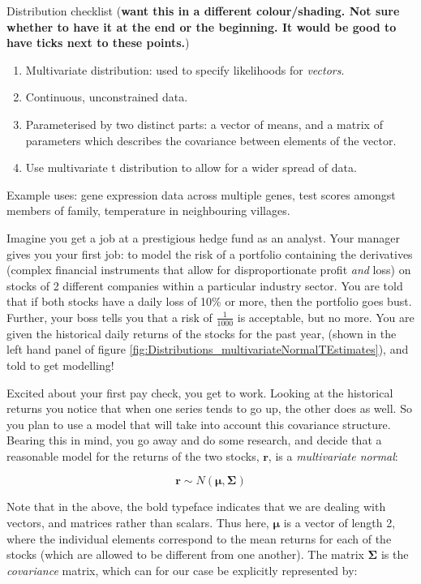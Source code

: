 \documentclass[11pt,fullpage]{book}
\begin{document}
Distribution checklist (\textbf{want this in a different colour/shading. Not sure whether to have it at the end or the beginning. It would be good to have ticks next to these points.})

\begin{enumerate}
\item Multivariate distribution: used to specify likelihoods for \textit{vectors}.
\item Continuous, unconstrained data.
\item Parameterised by two distinct parts: a vector of means, and a matrix of parameters which describes the covariance between elements of the vector.
\item Use multivariate t distribution to allow for a wider spread of data.
\end{enumerate}

Example uses: gene expression data across multiple genes, test scores amongst members of family, temperature in neighbouring villages.

Imagine you get a job at a prestigious hedge fund as an analyst. Your manager gives you your first job: to model the risk of a portfolio containing the derivatives (complex financial instruments that allow for disproportionate profit \textit{and} loss) on stocks of 2 different companies within a particular industry sector. You are told that if both stocks have a daily loss of 10\% or more, then the portfolio goes bust. Further, your boss tells you that a risk of $\frac{1}{1000}$ is acceptable, but no more. You are given the historical daily returns of the stocks for the past year, (shown in the left hand panel of figure \ref{fig:Distributions_multivariateNormalTEstimates}), and told to get modelling!

Excited about your first pay check, you get to work. Looking at the historical returns you notice that when one series tends to go up, the other does as well. So you plan to use a model that will take into account this covariance structure. Bearing this in mind, you go away and do some research, and decide that a reasonable model for the returns of the two stocks, $\boldsymbol{r}$, is a \textit{multivariate normal}:

\begin{equation}
\boldsymbol{r} \sim N(\boldsymbol{\mu},\boldsymbol{\Sigma})
\end{equation}

Note that in the above, the bold typeface indicates that we are dealing with vectors, and matrices rather than scalars. Thus here, $\boldsymbol{\mu}$ is a vector of length 2, where the individual elements correspond to the mean returns for each of the stocks (which are allowed to be different from one another). The matrix $\boldsymbol{\Sigma}$ is the \textit{covariance} matrix, which can for our case be explicitly represented by:
\end{document}
